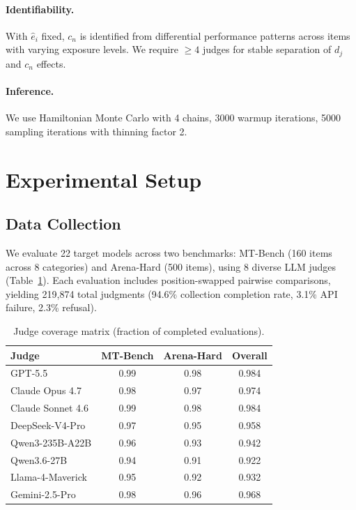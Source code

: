 \documentclass[letterpaper,11pt]{article}
\begin{document}
\paragraph{Identifiability.} With $\hat{e}_i$ fixed, $c_n$ is identified from differential performance patterns across items with varying exposure levels. We require $\geq 4$ judges for stable separation of $d_j$ and $c_n$ effects.

\paragraph{Inference.} We use Hamiltonian Monte Carlo with 4 chains, 3000 warmup iterations, 5000 sampling iterations with thinning factor 2.

\section{Experimental Setup}
\label{sec:setup}

\subsection{Data Collection}

We evaluate 22 target models across two benchmarks: MT-Bench (160 items across 8 categories) and Arena-Hard (500 items), using 8 diverse LLM judges (Table~\ref{tab:judge_coverage}). Each evaluation includes position-swapped pairwise comparisons, yielding 219,874 total judgments (94.6\% collection completion rate, 3.1\% API failure, 2.3\% refusal).

\begin{table}[t]
\centering
\caption{Judge coverage matrix (fraction of completed evaluations).}
\label{tab:judge_coverage}
\small
\begin{tabular}{lccc}
\toprule
Judge & MT-Bench & Arena-Hard & Overall \\
\midrule
GPT-5.5 & 0.99 & 0.98 & 0.984 \\
Claude Opus 4.7 & 0.98 & 0.97 & 0.974 \\
Claude Sonnet 4.6 & 0.99 & 0.98 & 0.984 \\
DeepSeek-V4-Pro & 0.97 & 0.95 & 0.958 \\
Qwen3-235B-A22B & 0.96 & 0.93 & 0.942 \\
Qwen3.6-27B & 0.94 & 0.91 & 0.922 \\
Llama-4-Maverick & 0.95 & 0.92 & 0.932 \\
Gemini-2.5-Pro & 0.98 & 0.96 & 0.968 \\
\bottomrule
\end{tabular}
\end{table}
\end{document}
